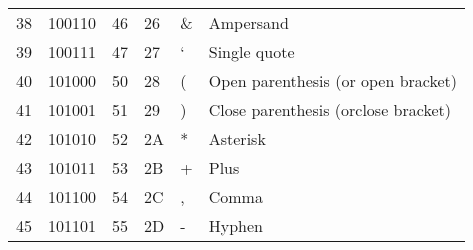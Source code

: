 \begin{center}
\begin{longtable}{llllll}
\rowcolor[HTML]{F3F6F6} 
{\color[HTML]{404040} 38}               & {\color[HTML]{404040} 100110}          & {\color[HTML]{404040} 46}             & {\color[HTML]{404040} 26}                   & {\color[HTML]{404040} \&}                 & {\color[HTML]{404040} Ampersand}                             \\
\rowcolor[HTML]{FCFCFC} 
{\color[HTML]{404040} 39}               & {\color[HTML]{404040} 100111}          & {\color[HTML]{404040} 47}             & {\color[HTML]{404040} 27}                   & {\color[HTML]{404040} ‘}                  & {\color[HTML]{404040} Single quote}                          \\
\rowcolor[HTML]{F3F6F6} 
{\color[HTML]{404040} 40}               & {\color[HTML]{404040} 101000}          & {\color[HTML]{404040} 50}             & {\color[HTML]{404040} 28}                   & {\color[HTML]{404040} (}                  & {\color[HTML]{404040} Open parenthesis (or open bracket)}    \\
\rowcolor[HTML]{FCFCFC} 
{\color[HTML]{404040} 41}               & {\color[HTML]{404040} 101001}          & {\color[HTML]{404040} 51}             & {\color[HTML]{404040} 29}                   & {\color[HTML]{404040} )}                  & {\color[HTML]{404040} Close parenthesis (orclose bracket)}   \\
\rowcolor[HTML]{F3F6F6} 
{\color[HTML]{404040} 42}               & {\color[HTML]{404040} 101010}          & {\color[HTML]{404040} 52}             & {\color[HTML]{404040} 2A}                   & {\color[HTML]{404040} *}                  & {\color[HTML]{404040} Asterisk}                              \\
\rowcolor[HTML]{FCFCFC} 
{\color[HTML]{404040} 43}               & {\color[HTML]{404040} 101011}          & {\color[HTML]{404040} 53}             & {\color[HTML]{404040} 2B}                   & {\color[HTML]{404040} +}                  & {\color[HTML]{404040} Plus}                                  \\
\rowcolor[HTML]{F3F6F6} 
{\color[HTML]{404040} 44}               & {\color[HTML]{404040} 101100}          & {\color[HTML]{404040} 54}             & {\color[HTML]{404040} 2C}                   & {\color[HTML]{404040} ,}                  & {\color[HTML]{404040} Comma}                                 \\
\rowcolor[HTML]{FCFCFC} 
{\color[HTML]{404040} 45}               & {\color[HTML]{404040} 101101}          & {\color[HTML]{404040} 55}             & {\color[HTML]{404040} 2D}                   & {\color[HTML]{404040} -}                  & {\color[HTML]{404040} Hyphen}                                \\

\end{longtable}
\end{center}
